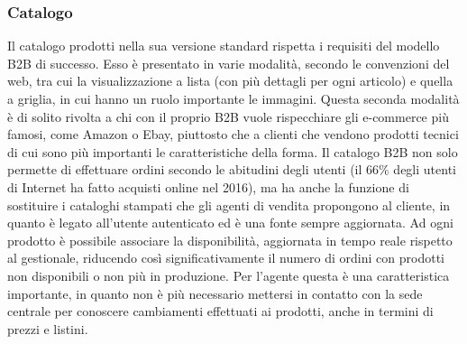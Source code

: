 \subsubsection{Catalogo}
Il catalogo prodotti nella sua versione standard rispetta i requisiti del modello B2B di successo. Esso è presentato in varie modalità, secondo le convenzioni del web, tra cui la visualizzazione a lista (con più dettagli per ogni articolo) e quella a griglia, in cui hanno un ruolo importante le immagini. Questa seconda modalità è di solito rivolta a chi con il proprio B2B vuole rispecchiare gli e-commerce più famosi, come Amazon o Ebay, piuttosto che a clienti che vendono prodotti tecnici di cui sono più importanti le caratteristiche della forma. Il catalogo B2B non solo permette di effettuare ordini secondo le abitudini degli utenti (il 66\% degli utenti di Internet ha fatto acquisti online nel 2016\autocite{eurostat}), ma ha anche la funzione di sostituire i cataloghi stampati che gli agenti di vendita propongono al cliente, in quanto è legato all'utente autenticato ed è una fonte sempre aggiornata. Ad ogni prodotto è possibile associare la disponibilità, aggiornata in tempo reale rispetto al gestionale, riducendo così significativamente il numero di ordini con prodotti non disponibili o non più in produzione. Per l'agente questa è una caratteristica importante, in quanto non è più necessario mettersi in contatto con la sede centrale per conoscere cambiamenti effettuati ai prodotti, anche in termini di prezzi e listini.

